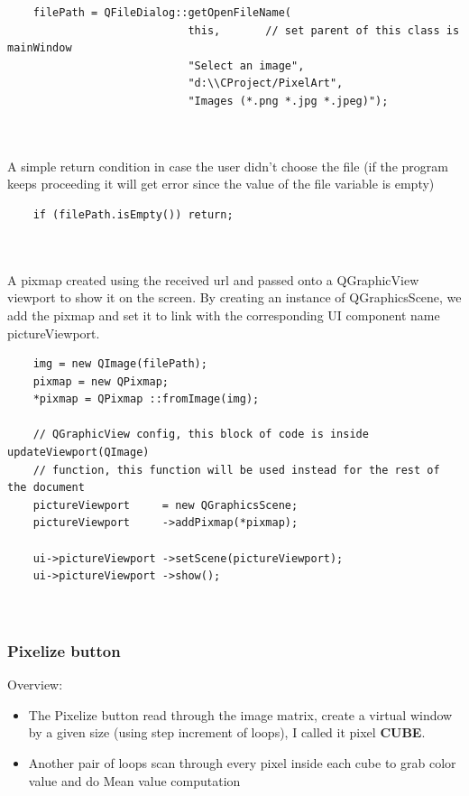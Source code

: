 \documentclass[english]{article}
\begin{document}
{\lstset{language=C++}
\begin{lstlisting}	
	filePath = QFileDialog::getOpenFileName(
							this,		// set parent of this class is mainWindow
							"Select an image",
							"d:\\CProject/PixelArt",
							"Images (*.png *.jpg *.jpeg)");
							
		
\end{lstlisting}

A simple return condition in case the user didn't choose the file (if the program keeps proceeding it will get error since the value of the file variable is empty) 


\lstset{language=C++}
\begin{lstlisting}
	if (filePath.isEmpty()) return;
	
	
\end{lstlisting}

A pixmap created using the received url and passed onto a QGraphicView viewport to show it on the screen. By creating an instance of QGraphicsScene, we add the pixmap and set it to link with the corresponding UI component name pictureViewport.

\lstset{language=C++}
\begin{lstlisting}
	img = new QImage(filePath);
	pixmap = new QPixmap;
	*pixmap = QPixmap ::fromImage(img);
	
	// QGraphicView config, this block of code is inside updateViewport(QImage)
	// function, this function will be used instead for the rest of the document
	pictureViewport     = new QGraphicsScene;
	pictureViewport     ->addPixmap(*pixmap);
	
	ui->pictureViewport ->setScene(pictureViewport);
	ui->pictureViewport ->show();
	
	
\end{lstlisting}


\subsubsection{Pixelize button}

Overview: 

\begin{itemize}
	\item The Pixelize button read through the image matrix, create a virtual window by a given size (using step increment of loops), I called it pixel \textbf{CUBE}. 
	
	\item Another pair of loops scan through every pixel inside each cube to grab color value and do Mean value computation 
	

\end{itemize}}
\end{document}
